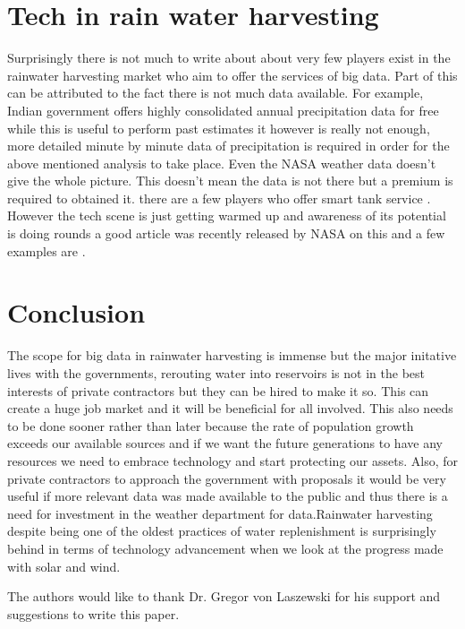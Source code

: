 \documentclass[sigconf]{acmart}
\begin{document}
\section{Tech in rain water harvesting}
Surprisingly there is not much to write about about very few players exist in the rainwater harvesting market who aim to offer the services of big data. Part of this can be attributed to the fact there is not much data available. For example, Indian government offers highly consolidated annual precipitation data for free while this is useful to perform past estimates it however is really not enough, more detailed minute by minute data of precipitation is required in order for the above mentioned analysis to take place. Even the NASA weather data doesn't give the whole picture. This doesn't mean the data is not there but a premium is required to obtained it. there are a few players who offer smart tank service . However the tech scene is just getting  warmed up and awareness of its potential is doing rounds a good article was recently released by NASA on this \cite{Morrow2015} and a few examples are \cite{UNEP2017}.

\section{Conclusion}

The scope for big data in rainwater harvesting is immense but the major initative lives with the governments, rerouting water into reservoirs is not in the best interests of private contractors but they can be hired to make it so. This can create a huge job market and it will be beneficial for all involved. This also needs to be done sooner rather than later because the rate of population growth exceeds our available sources and if we want the future generations to have any resources we need to embrace technology and start protecting our assets. Also, for private contractors to approach the government with proposals it would be very useful if more relevant data was made available to the public and thus there is a need for investment in the weather department for data.Rainwater harvesting despite being one of the oldest practices of water replenishment is surprisingly behind in terms of technology advancement when we look at the progress made with solar and wind.


\begin{acks}

  The authors would like to thank Dr. Gregor von Laszewski for his support and suggestions to write this paper.

\end{acks}


 
\end{document}
